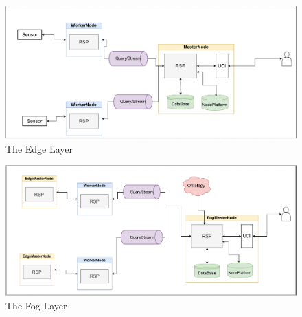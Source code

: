\documentclass[5p,times]{elsarticle}
\begin{document}
  




\begin{figure}[t]
  \centering
  \includegraphics[width=\columnwidth]{EDgeLayer.drawio.pdf}
  \caption{The Edge Layer}
  \label{fig:edgelayer}
\end{figure}

\begin{figure}[t]
  \centering
  \includegraphics[width=\columnwidth]{FogLayer.drawio.pdf}
  \caption{The Fog Layer}
  \label{fig:foglayer}
\end{figure}
\end{document}
